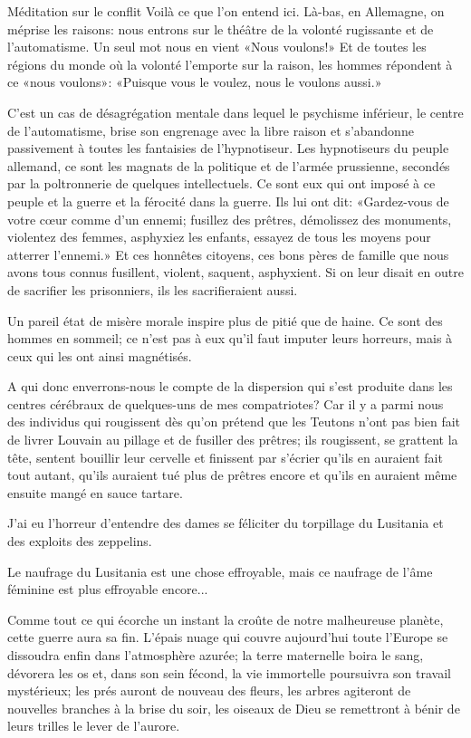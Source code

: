 \begin{chapter}{Méditation sur le conflit}
Voilà ce que l'on entend ici. Là-bas, en Allemagne, on méprise les
raisons: nous entrons sur le théâtre de la volonté rugissante et de
l'automatisme. Un seul mot nous en vient «Nous voulons!» Et de toutes
les régions du monde où la volonté l'emporte sur la raison, les hommes
répondent à ce «nous voulons»: «Puisque vous le voulez, nous le voulons
aussi.»

C'est un cas de désagrégation mentale dans lequel le psychisme
inférieur, le centre de l'automatisme, brise son engrenage avec la libre
raison et s'abandonne passivement à toutes les fantaisies de
l'hypnotiseur. Les hypnotiseurs du peuple allemand, ce sont les magnats
de la politique et de l'armée prussienne, secondés par la poltronnerie
de quelques intellectuels. Ce sont eux qui ont imposé à ce peuple et la
guerre et la férocité dans la guerre. Ils lui ont dit: «Gardez-vous de
votre cœur comme d'un ennemi; fusillez des prêtres, démolissez des
monuments, violentez des femmes, asphyxiez les enfants, essayez de tous
les moyens pour atterrer l'ennemi.» Et ces honnêtes citoyens, ces bons
pères de famille que nous avons tous connus fusillent, violent, saquent,
asphyxient. Si on leur disait en outre de sacrifier les prisonniers, ils
les sacrifieraient aussi.

Un pareil état de misère morale inspire plus de pitié que de haine. Ce
sont des hommes en sommeil; ce n'est pas à eux qu'il faut imputer leurs
horreurs, mais à ceux qui les ont ainsi magnétisés.

A qui donc enverrons-nous le compte de la dispersion qui s'est produite
dans les centres cérébraux de quelques-uns de mes compatriotes? Car il
y a parmi nous des individus qui rougissent dès qu'on prétend que les
Teutons n'ont pas bien fait de livrer Louvain au pillage et de fusiller
des prêtres; ils rougissent, se grattent la tête, sentent bouillir leur
cervelle et finissent par s'écrier qu'ils en auraient fait tout autant,
qu'ils auraient tué plus de prêtres encore et qu'ils en auraient même
ensuite mangé en sauce tartare.

J'ai eu l'horreur d'entendre des dames se féliciter du torpillage du
Lusitania et des exploits des zeppelins.

Le naufrage du Lusitania est une chose effroyable, mais ce naufrage de
l'âme féminine est plus effroyable encore...

Comme tout ce qui écorche un instant la croûte de notre malheureuse
planète, cette guerre aura sa fin. L'épais nuage qui couvre aujourd'hui
toute l'Europe se dissoudra enfin dans l'atmosphère azurée; la terre
maternelle boira le sang, dévorera les os et, dans son sein fécond, la
vie immortelle poursuivra son travail mystérieux; les prés auront de
nouveau des fleurs, les arbres agiteront de nouvelles branches à la
brise du soir, les oiseaux de Dieu se remettront à bénir de leurs
trilles le lever de l'aurore.


\end{chapter}
